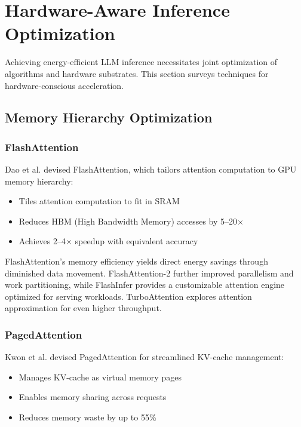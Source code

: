 \documentclass[11pt]{article}
\begin{document}
\section{Hardware-Aware Inference Optimization}
\label{sec:hardware}

Achieving energy-efficient LLM inference necessitates joint optimization of algorithms and hardware substrates. This section surveys techniques for hardware-conscious acceleration.

\subsection{Memory Hierarchy Optimization}

\subsubsection{FlashAttention}

Dao et al. \cite{dao2022flashattention} devised FlashAttention, which tailors attention computation to GPU memory hierarchy:
\begin{itemize}
    \item Tiles attention computation to fit in SRAM
    \item Reduces HBM (High Bandwidth Memory) accesses by 5--20$\times$
    \item Achieves 2--4$\times$ speedup with equivalent accuracy
\end{itemize}

FlashAttention's memory efficiency yields direct energy savings through diminished data movement. FlashAttention-2 \cite{dao2023flashattention2} further improved parallelism and work partitioning, while FlashInfer \cite{ye2025flashinfer} provides a customizable attention engine optimized for serving workloads. TurboAttention \cite{kang2024turboattention} explores attention approximation for even higher throughput.

\subsubsection{PagedAttention}

Kwon et al. \cite{kwon2023vllm} devised PagedAttention for streamlined KV-cache management:
\begin{itemize}
    \item Manages KV-cache as virtual memory pages
    \item Enables memory sharing across requests
    \item Reduces memory waste by up to 55\%
\end{itemize}
\end{document}
